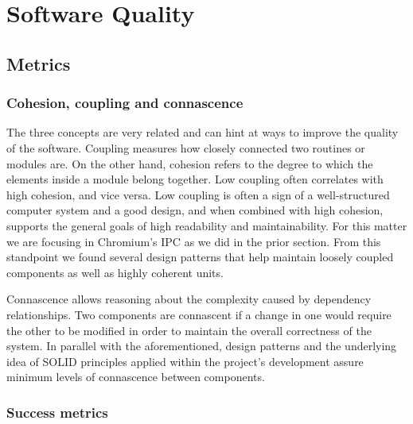 \chapter{Software Quality}
\label{chap:quality}

\section{Metrics}

\subsection{Cohesion, coupling and connascence}

The three concepts are very related and can hint at ways to improve the quality of the software. Coupling measures how closely connected two routines or modules are. On the other hand, cohesion refers to the degree to which the elements inside a module belong together. Low coupling often correlates with high cohesion, and vice versa. Low coupling is often a sign of a well-structured computer system and a good design, and when combined with high cohesion, supports the general goals of high readability and maintainability. For this matter we are focusing in Chromium's IPC as we did in the prior section. From this standpoint we found several design patterns that help maintain loosely coupled components as well as highly coherent units.

Connascence allows reasoning about the complexity caused by dependency relationships. Two components are connascent if a change in one would require the other to be modified in order to maintain the overall correctness of the system. In parallel with the aforementioned, design patterns and the underlying idea of SOLID principles applied within the project's development assure minimum levels of connascence between components.

\subsection{Success metrics}

